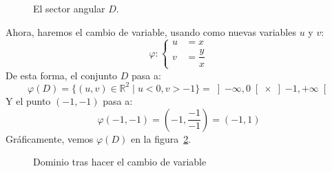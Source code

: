 \begin{ejemplo}
\begin{figure}[H]
\caption{El sector angular $D$.}
\label{graph:sector_angular_ejercicio}
\end{figure}
\noindent
    Ahora, haremos el cambio de variable, usando como nuevas variables $u$ y $v$:
    \begin{equation*}
        \varphi: \left\{\begin{array}{rl}
                u &= x \\
                v &= \dfrac{y}{x}
        \end{array}\right.
    \end{equation*}
    De esta forma, el conjunto $D$ pasa a:
    \begin{equation*}
        \varphi(D) = \{(u,v)\in \mathbb{R}^2 \mid u < 0, v > -1\} = \left]-\infty, 0\right[ \times \left]-1,+\infty\right[
    \end{equation*}
    Y el punto $(-1,-1)$ pasa a:
    \begin{equation*}
        \varphi(-1,-1) = \left(-1, \dfrac{-1}{-1}\right) = (-1, 1)
    \end{equation*}
    Gráficamente, vemos $\varphi(D)$ en la figura~\ref{graph:banda_horizontal_ejercicio}.

\begin{figure}[H]
\centering
{}
\caption{Dominio tras hacer el cambio de variable}
\label{graph:banda_horizontal_ejercicio}
\end{figure}


\end{ejemplo}
